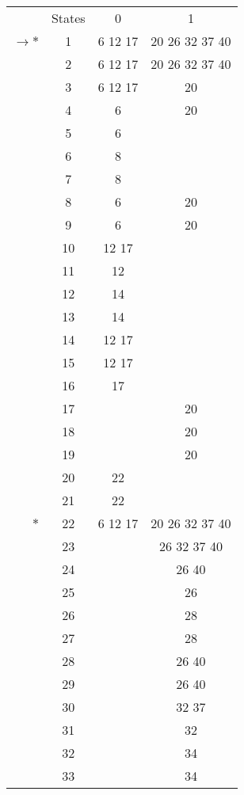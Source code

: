 \begin{tabular}[c]{r|c|c|c|} \cline{2-4}
    & States & 0 & 1 \\ \cline{2-4}
    $\rightarrow *$ & 1 & 6 12 17 & 20 26 32 37 40 \\ \cline{2-4}
    & 2 & 6 12 17 & 20 26 32 37 40 \\ \cline{2-4}
    & 3 & 6 12 17 & 20 \\ \cline{2-4}
    & 4 & 6 & 20 \\ \cline{2-4}
    & 5 & 6 & \\ \cline{2-4}
    & 6 & 8 & \\ \cline{2-4}
    & 7 & 8 & \\ \cline{2-4}
    & 8 & 6 & 20 \\ \cline{2-4}
    & 9 & 6 & 20 \\ \cline{2-4}
    & 10 & 12 17 & \\ \cline{2-4}
    & 11 & 12 & \\ \cline{2-4}
    & 12 & 14 & \\ \cline{2-4}
    & 13 & 14 & \\ \cline{2-4}
    & 14 & 12 17 & \\ \cline{2-4}
    & 15 & 12 17 & \\ \cline{2-4}
    & 16 & 17 & \\ \cline{2-4}
    & 17 & & 20 \\ \cline{2-4}
    & 18 & & 20 \\ \cline{2-4}
    & 19 & & 20 \\ \cline{2-4}
    & 20 & 22 & \\ \cline{2-4}
    & 21 & 22 & \\ \cline{2-4}
    $*$ & 22 & 6 12 17 & 20 26 32 37 40 \\ \cline{2-4}
    & 23 & & 26 32 37 40 \\ \cline{2-4}
    & 24 & & 26 40 \\ \cline{2-4}
    & 25 & & 26 \\ \cline{2-4}
    & 26 & & 28 \\ \cline{2-4}
    & 27 & & 28 \\ \cline{2-4}
    & 28 & & 26 40 \\ \cline{2-4}
    & 29 & & 26 40 \\ \cline{2-4}
    & 30 & & 32 37 \\ \cline{2-4}
    & 31 & & 32 \\ \cline{2-4}
    & 32 & & 34 \\ \cline{2-4}
    & 33 & & 34 \\ \cline{2-4}

\end{tabular}

